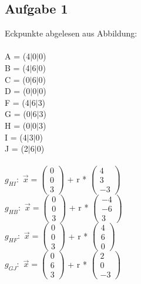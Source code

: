 \documentclass{article}
\begin{document}
	\subsection*{Aufgabe 1}
	Eckpunkte abgelesen aus Abbildung: \\
	\\
	A = (4$|$0$|$0)\\
	B = (4$|$6$|$0)\\
	C = (0$|$6$|$0)\\
	D = (0$|$0$|$0)  \\
	F = (4$|$6$|$3)\\
	G = (0$|$6$|$3)\\
	H = (0$|$0$|$3)  \\
	I = (4$|$3$|$0)\\
	J = (2$|$6$|$0)\\
	\\
	$g_{HI}:$ $\vec{x} = 
	\left(\begin{array}{c}
	 0 \\ 0 \\ 3
	\end{array}\right)$
	+ r * 
	$
	\left(\begin{array}{c}
	4 \\ 3 \\ -3
	\end{array}\right)
	$
	\\
	$g_{HB}:$ $\vec{x} = 
	\left(\begin{array}{c}
	0 \\ 0 \\ 3
	\end{array}\right)$
	+ r * 
	$
	\left(\begin{array}{c}
	-4 \\ -6 \\ 3 
	\end{array}\right)
	$
	\\
	$g_{HF}:$ $\vec{x} = 
	\left(\begin{array}{c}
	0 \\ 0 \\ 3
	\end{array}\right)$
	+ r * 
	$
	\left(\begin{array}{c}
	4 \\ 6 \\ 0
	\end{array}\right)
	$
	\\
	$g_{GJ}:$ $\vec{x} = 
	\left(\begin{array}{c}
	0 \\ 6 \\ 3
	\end{array}\right)$
	+ r * 
	$
	\left(\begin{array}{c}
	2 \\ 0 \\ -3
	\end{array}\right)
	$
\end{document}
